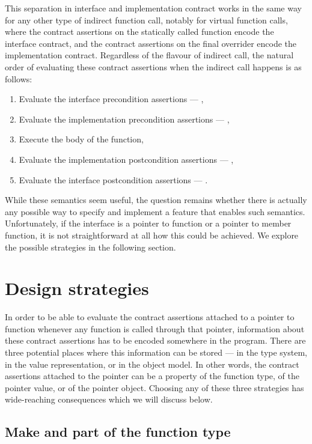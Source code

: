 This separation in interface and implementation contract works in the same way for any other type of indirect function call, notably for virtual function calls, where the contract assertions on the statically called function encode the interface contract, and the contract assertions on the final overrider encode the implementation contract. Regardless of the flavour of indirect call, the natural order of evaluating these contract assertions when the indirect call happens is as follows:
\begin{enumerate}
\item Evaluate the interface precondition assertions --- ,
\item Evaluate the implementation precondition assertions --- ,
\item Execute the body of the function,
\item Evaluate the implementation postcondition assertions --- ,
\item Evaluate the interface postcondition assertions --- .
\end{enumerate}
While these semantics seem useful, the question remains whether there is actually any possible way to specify and implement a feature that enables such semantics. Unfortunately, if the interface is a pointer to function or a pointer to member function, it is not straightforward at all how this could be achieved. We explore the possible strategies in the following section.

\section{Design strategies}

In order to be able to evaluate the contract assertions attached to a pointer to function whenever any function is called through that pointer, information about these contract assertions has to be encoded somewhere in the program. There are three potential places where this information can be stored --- in the type system, in the value representation, or in the object model. In other words, the contract assertions attached to the pointer can be a property of the function type, of the pointer value, or of the pointer object. Choosing any of these three strategies has wide-reaching consequences which we will discuss below.

\subsection{Make  and  part of the function type}

